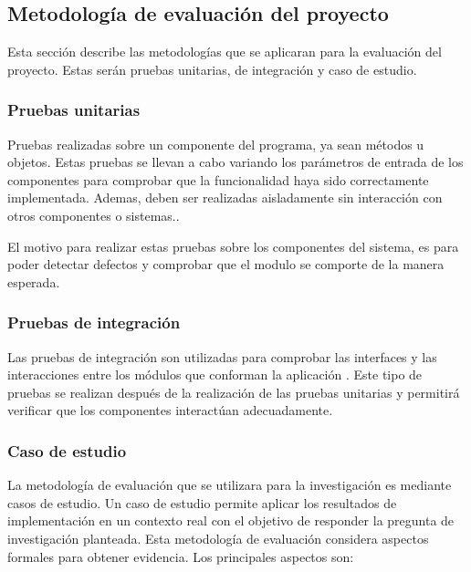 \documentclass[11pt,letterpaper]{article}
\begin{document}
\subsection{Metodología de evaluación del proyecto}

Esta sección describe las metodologías que se aplicaran para la evaluación del proyecto. Estas serán pruebas unitarias, de integración y caso de estudio.

\subsubsection{Pruebas unitarias}
Pruebas realizadas sobre un componente del programa, ya sean métodos u objetos. Estas pruebas se llevan a cabo variando los parámetros de entrada de los componentes para comprobar que la funcionalidad haya sido correctamente implementada. Ademas, deben ser realizadas aisladamente sin interacción con otros componentes o sistemas.\cite{Sommerville2010}.

El motivo para realizar estas pruebas sobre los componentes del sistema, es para poder detectar defectos y comprobar que el modulo se comporte de la manera esperada.

\subsubsection{Pruebas de integración}
Las pruebas de integración son utilizadas para comprobar las interfaces y las interacciones entre los módulos que conforman la aplicación \cite{Leung1990}. Este tipo de pruebas se realizan después de la realización de las pruebas unitarias y permitirá verificar que  los componentes interactúan  adecuadamente. 

\subsubsection{Caso de estudio}
La metodología de evaluación \cite{Yin2009,Shull2008} que se utilizara para la investigación es mediante casos de estudio. Un caso de estudio permite aplicar los resultados de implementación en un contexto real con el objetivo de responder la pregunta de investigación planteada. Esta metodología de evaluación considera aspectos formales para obtener evidencia. Los principales aspectos son:
\end{document}
